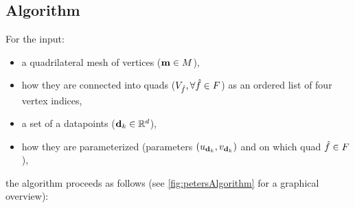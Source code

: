 \subsection{Algorithm}
For the input:
\begin{itemize}
\item a quadrilateral mesh of vertices ($\petersControlMeshVec \in \petersControlMesh$),
\item how they are connected into quads ($\verticesof{\hat{f}}, \forall \hat{f} \in \petersFaces$) as an ordered list of four vertex indices,
\item a set of a datapoints ($\lsDataPoint_k \in \mathbb{R}^d$),
\item how they are parameterized (parameters $(u_{\lsDataPoint_k}, v_{\lsDataPoint_k})$ and on which quad $\hat{f}\in\petersFaces$),
\end{itemize}
the algorithm proceeds as follows (see \autoref{fig:petersAlgorithm} for a graphical overview):
